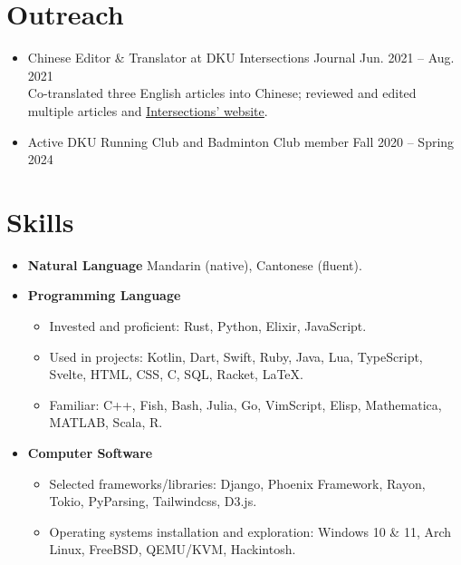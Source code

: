 \documentclass[letterpaper,11pt]{article}
\newcommand{\uhref}[2]{\href{#1}{\underline{#2}}}
\begin{document}
\section{Outreach}
\begin{itemize}
    \item Chinese Editor \& Translator at DKU Intersections Journal\hfill
    Jun. 2021 -- Aug. 2021\\{\small
    Co-translated three English articles into Chinese;
    reviewed and edited multiple articles and
    \uhref{https://sites.duke.edu/intersections/}{Intersections' website}.
    }
    \vspace{-4pt}
    \item Active DKU Running Club and Badminton Club member\hfill
    Fall 2020 -- Spring 2024
    \vspace{-4pt}
\end{itemize}

\section{Skills}
\begin{itemize}[leftmargin=0.5cm, label={}]
    \item \textbf{Natural Language}\quad
    Mandarin (native), Cantonese (fluent).\vspace{-4pt}
    \item \textbf{Programming Language}\vspace{-4pt}
    \begin{itemize}\small
        \item Invested and proficient: Rust, Python, Elixir, JavaScript.
        \item Used in projects:
        Kotlin, Dart, Swift, Ruby, Java, Lua, TypeScript,
        Svelte, HTML, CSS, C, SQL, Racket, \LaTeX{}.
        \item Familiar: C++, Fish, Bash, Julia, Go, VimScript, Elisp,
        Mathematica, MATLAB, Scala, R.\vspace{-4pt}
    \end{itemize}
    \item \textbf{Computer Software}\vspace{-4pt}
    \begin{itemize}\small
        \item Selected frameworks/libraries:
        Django, Phoenix Framework, Rayon, Tokio, PyParsing, Tailwindcss, D3.js.
        \item Operating systems installation and exploration:
        Windows 10 \& 11, Arch Linux, FreeBSD, QEMU/KVM, Hackintosh.
    \end{itemize}
\end{itemize}
\end{document}
